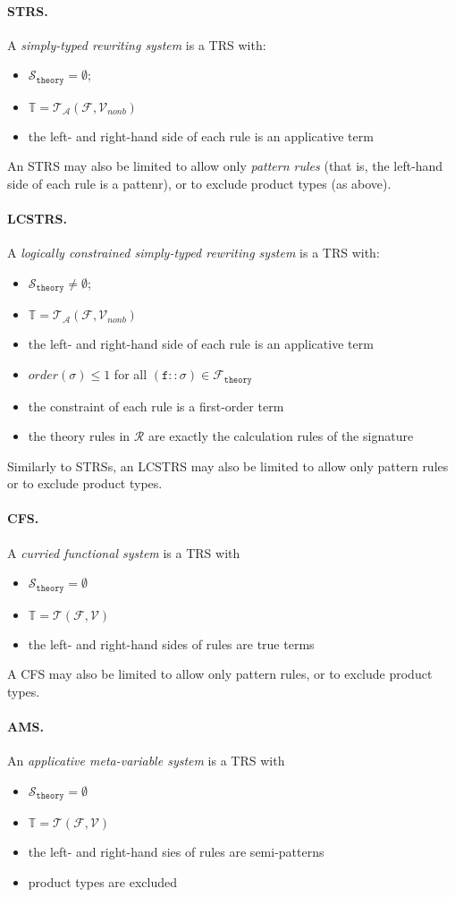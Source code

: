\documentclass{lmcs}
\theoremstyle{theorem}\newtheorem{theorem}{Theorem}
\theoremstyle{theorem}\newtheorem{lemma}[theorem]{Lemma}
\theoremstyle{theorem}\newtheorem{corollary}[theorem]{Corollary}
\theoremstyle{definition}\newtheorem{definition}[theorem]{Definition}
\theoremstyle{definition}\newtheorem{example}[theorem]{Example}
\newcommand{\F}{\mathcal{F}}
\newcommand{\thF}{\mathcal{F}_{\mathtt{theory}}}
\newcommand{\V}{\mathcal{V}}
\newcommand{\Vfree}{\mathcal{V}_{\mathit{nonb}}}
\newcommand{\thSorts}{\mathcal{S}_{\mathtt{theory}}}
\newcommand{\Terms}{\mathcal{T}}
\newcommand{\ATerms}{\mathcal{T}_{\mathcal{A}}}
\newcommand{\Rules}{\mathcal{R}}
\newcommand{\termsset}{\mathbb{T}}
\newcommand{\order}{\mathit{order}}
\newcommand{\atype}{\sigma}
\newcommand{\identifier}[1]{\mathtt{#1}}
\newcommand{\afun}{\identifier{f}}
\newcommand{\myparagraph}[1]{\paragraph{\textbf{#1.}}}
\begin{document}
\myparagraph{STRS}
A \emph{simply-typed rewriting system} is a TRS with:
\begin{itemize}
\item $\thSorts = \emptyset$;
\item $\termsset = \ATerms(\F,\Vfree)$
\item the left- and right-hand side of each rule is an applicative term
\end{itemize}

An STRS may also be limited to allow only \emph{pattern rules} (that is, the
left-hand side of each rule is a pattenr), or to exclude product types (as
above).

\myparagraph{LCSTRS}
A \emph{logically constrained simply-typed rewriting system} is a TRS with:
\begin{itemize}
\item $\thSorts \neq \emptyset$;
\item $\termsset = \ATerms(\F,\Vfree)$
\item the left- and right-hand side of each rule is an applicative term
\item $\order(\atype) \leq 1$ for all $(\afun :: \atype) \in \thF$
\item the constraint of each rule is a first-order term
\item the theory rules in $\Rules$ are exactly the calculation rules of the
  signature
\end{itemize}

Similarly to STRSs, an LCSTRS may also be limited to allow only pattern rules
or to exclude product types.

\myparagraph{CFS}
A \emph{curried functional system} is a TRS with
\begin{itemize}
\item $\thSorts = \emptyset$
\item $\termsset = \Terms(\F,\V)$
\item the left- and right-hand sides of rules are true terms
\end{itemize}

A CFS may also be limited to allow only pattern rules, or to exclude product
types.

\myparagraph{AMS}
An \emph{applicative meta-variable system} is a TRS with
\begin{itemize}
\item $\thSorts = \emptyset$
\item $\termsset = \Terms(\F,\V)$
\item the left- and right-hand sies of rules are semi-patterns
\item product types are excluded
\end{itemize}
\end{document}
